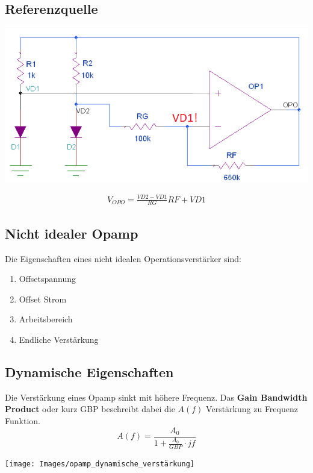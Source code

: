 \subsection{Referenzquelle}
\begin{minipage}{0.20\textwidth}
	\includegraphics[width=\linewidth,keepaspectratio=true]{./Images/referenzquelle}
\end{minipage}%
\begin{minipage}{0.30\textwidth}
	\begin{align*}
		V_{OPO} = \frac{VD2 - VD1}{RG}RF + VD1
	\end{align*}
\end{minipage}


\subsection{Nicht idealer Opamp}
Die Eigenschaften eines nicht idealen Operationsverstärker sind:
\begin{enumerate}[nosep]
	\item Offsetspannung	
	\item Offset Strom
	\item Arbeitsbereich
	\item Endliche Verstärkung	
\end{enumerate}

\subsection{Dynamische Eigenschaften}
Die Verstärkung eines Opamp sinkt mit höhere Frequenz. Das \textbf{Gain Bandwidth Product} oder kurz GBP beschreibt dabei die $A(f)$ Verstärkung zu Frequenz Funktion.
\[
A(f) = \frac{A_0}{1 + \frac{A_0}{GBP}\cdot jf}
\]
\begin{center}
	\texttt{[image: Images/opamp\_dynamische\_verstärkung]}
\end{center}

